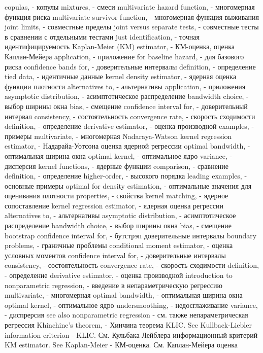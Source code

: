 copulas, - копулы
mixtures, - смеси
multivariate hazard function, - многомерная функция риска
multivariate survivor function, - многомерная функция выживания
joint limits, - совместные пределы
joint versus separate tests, - совместные тесты в сравнении с отдельными тестами
just identification, - точная идентифицируемость
Kaplan-Meier (KM) estimator, - КМ-оценка, оценка Каплан-Мейера
application, - приложение
for baseline hazard, - для базового риска
confidence bands for, - доверительные интервалы
definition, - определение
tied data, -  идентичные данные
kernel density estimator, - ядерная оценка функции плотности
alternatives to, - альтернативы
application, - приложения
asymptotic distribution, - асимптотическое распределение
bandwidth choice, - выбор ширины окна
bias, - смещение
confidence interval for, - доверительный интервал
consistency, - состоятельность
convergence rate, - скорость сходимости
definition, - определение
derivative estimator, - оценка производной
examples, - примеры
multivariate, - многомерная
Nadaraya-Watson kernel regression estimator, - Надарайа-Уотсона оценка ядерной регрессии
optimal bandwidth, - оптимальная ширина окна
optimal kernel, - оптимальное ядро
variance, - дисперсия
kernel functions, - ядерные функции
comparison, - сравнение
definition, - определение
higher-order, - высокого порядка
leading examples, - основные примеры
optimal for density estimation, - оптимальные значения для оценивания плотности
properties, - свойства
kernel matching, - ядерное сопоставление
kernel regression estimator, - ядерная оценка регрессии
alternatives to, - альтернативы
asymptotic distribution, - асимптотическое распределение
bandwidth choice, - выбор ширины окна
bias, - смещение
bootstrap confidence interval for, - бутстрэп доверительные интервалы
boundary problems, - граничные проблемы
conditional moment estimator, - оценка условных моментов
confidence interval for, - доверительные интервалы
consistency, - состоятельность
convergence rate, - скорость сходимости
definition, - определение
derivative estimator, - оценка производной
introduction to nonparametric regression, - введение в непараметрическую регрессию
multivariate, - многомерная
optimal bandwidth, - оптимальная ширина окна
optimal kernel, - оптимальное ядро
undersmoothing, - недосглаживание
variance, - диспрерсия
see also nonparametric regression - см. также непараметрическая регрессия
Khinchine’s theorem, - Хинчина теорема
KLIC. See Kullback-Liebler information criterion - KLIC. См. Кульбака-Лейблера информационный критерий
KM estimator. See Kaplan-Meier - КМ-оценка. См. Каплан-Мейера оценка
